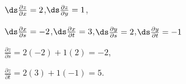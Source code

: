 {$\ds\frac{\partial z}{\partial x} = 2$,\quad $\ds\frac{\partial z}{\partial y} = 1$,

$\ds\frac{\partial x}{\partial s} = -2$,\quad $\ds\frac{\partial x}{\partial t} = 3$,\quad $\ds \frac{\partial y}{\partial s} = 2$,\quad $\ds \frac{\partial y}{\partial t} = -1$
}
{$\frac{\partial z}{\partial s} = 2(-2)+1(2) = -2$, 

$\frac{\partial z}{\partial t} = 2(3)+1(-1) = 5$.
}